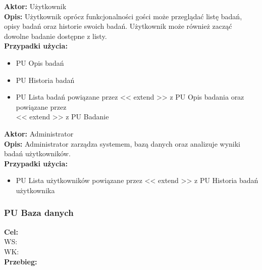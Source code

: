 \documentclass[12pt, letterpaper]{article}
\begin{document}
		\vspace{1cm}
		
		\textbf{Aktor:} Użytkownik\\
		
		\textbf{Opis:} Użytkownik oprócz funkcjonalności gości może przeglądać listę badań, opisy badań oraz historie swoich badań. Użytkownik może również zacząć dowolne badanie dostępne z listy.\\
		
		\textbf{Przypadki użycia:}
		
		\begin{itemize}
			\item PU Opis badań
			\item PU Historia badań
			\item PU Lista badań powiązane przez << extend >> z PU Opis badania oraz powiązane przez\\ << extend >> z PU Badanie
		\end{itemize}
		
		\vspace{1cm}
		
		\textbf{Aktor:} Administrator\\
		
		\textbf{Opis:} Administrator zarządza systemem, bazą danych oraz analizuje wyniki badań użytkowników.\\
		
		\textbf{Przypadki użycia:}
		
		\begin{itemize}
			\item PU Lista użytkowników powiązane przez << extend >> z PU Historia badań użytkownika
		\end{itemize}		
		
		\newpage
		
		
		\subsubsection{PU Baza danych}
		
		\quad
		
		\textbf{Cel: }\\
		
		WS: \\
		
		WK: \\
		
		\textbf{Przebieg:}\\
		 \\
		
\end{document}
